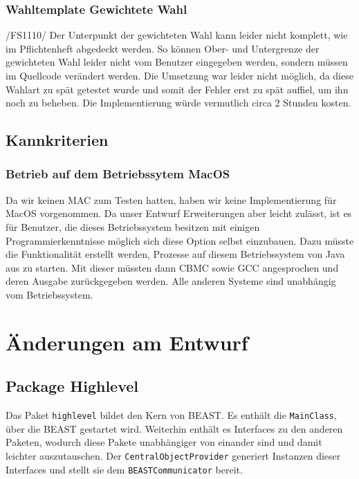 \documentclass[a4paper]{scrreprt}
\begin{document}
\subsection{Wahltemplate Gewichtete Wahl}
/FS1110/ 
Der Unterpunkt der gewichteten Wahl kann leider nicht komplett, wie im Pflichtenheft abgedeckt werden.
So können Ober- und Untergrenze der gewichteten Wahl leider nicht vom Benutzer eingegeben werden, sondern müssen im Quellcode verändert werden. Die Umsetzung war leider nicht möglich, da diese Wahlart zu spät getestet wurde und somit der Fehler erst zu spät auffiel, um ihn noch zu beheben. Die Implementierung würde vermutlich circa 2 Stunden kosten.

\section{Kannkriterien}

\subsection{Betrieb auf dem Betriebssytem MacOS} 
Da wir keinen MAC zum Testen hatten, haben wir keine Implementierung für MacOS
vorgenommen. Da unser Entwurf Erweiterungen aber leicht zulässt, ist es für
Benutzer, die dieses Betriebssystem besitzen mit einigen Programmierkenntnisse
möglich sich diese Option selbst einzubauen. Dazu müsste die Funktionalität erstellt werden, Prozesse auf diesem Betriebssystem von Java aus zu starten. Mit dieser müssten dann CBMC sowie GCC angesprochen und deren Ausgabe zurückgegeben werden. Alle anderen Systeme sind unabhängig vom Betriebssystem.



\chapter{Änderungen am Entwurf}
\section{Package Highlevel}

Das Paket \verb!highlevel! bildet den Kern von BEAST. Es enthält die \verb!MainClass!, über die BEAST gestartet wird. Weiterhin enthält es Interfaces zu den anderen Paketen, wodurch diese Pakete unabhängiger von einander sind und damit leichter auszutauschen. Der \verb!CentralObjectProvider! generiert Instanzen dieser Interfaces und stellt sie dem \verb!BEASTCommunicator! bereit. \\
\end{document}
